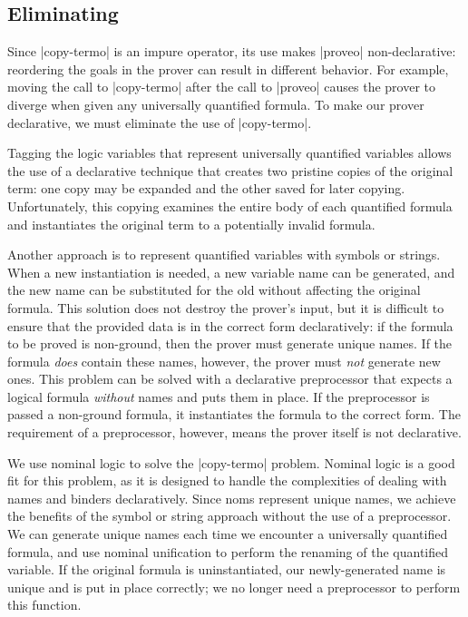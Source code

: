 \subsection{Eliminating \copytermo}\label{copytermo}
\enlargethispage{1\baselineskip} %

Since \scheme|copy-termo| is an impure operator, its use makes
\scheme|proveo| non-declarative: reordering the goals in the prover
can result in different behavior. For example, moving the call to
\scheme|copy-termo| after the call to \scheme|proveo| causes the
prover to diverge when given any universally quantified formula. To
make our prover declarative, we must eliminate the use of
\scheme|copy-termo|.

Tagging the logic variables that represent universally quantified
variables allows the use of a declarative technique that creates two
pristine copies of the original term: one copy may be expanded and the
other saved for later copying.  Unfortunately, this copying examines
the entire body of each quantified formula and instantiates the
original term to a potentially invalid formula.

Another approach is to represent quantified variables with symbols or
strings. When a new instantiation is needed, a new variable name can
be generated, and the new name can be substituted for the old without
affecting the original formula. This solution does not destroy the
prover's input, but it is difficult to ensure that the provided data
is in the correct form declaratively: if the formula to be proved is
non-ground, then the prover must generate unique names.  If the
formula \textit{does} contain these names, however, the prover must
\textit{not} generate new ones. This problem can be solved with a
declarative preprocessor that expects a logical formula
\textit{without} names and puts them in place. If the preprocessor is
passed a non-ground formula, it instantiates the formula to the
correct form. %
The requirement of a preprocessor, however,
means the prover itself is not declarative.

We use nominal logic to solve the \scheme|copy-termo| problem.
Nominal logic is a good fit for this problem, as it is designed to
handle the complexities of dealing with names and binders
declaratively.
Since noms represent unique names, we achieve the benefits of the
symbol or string approach without the use of a preprocessor. We can
generate unique names each time we encounter a universally quantified
formula, and use nominal unification to perform the renaming of the
quantified variable. If the original formula is uninstantiated, our
newly-generated name is unique and is put in place correctly; we no
longer need a preprocessor to perform this function.

